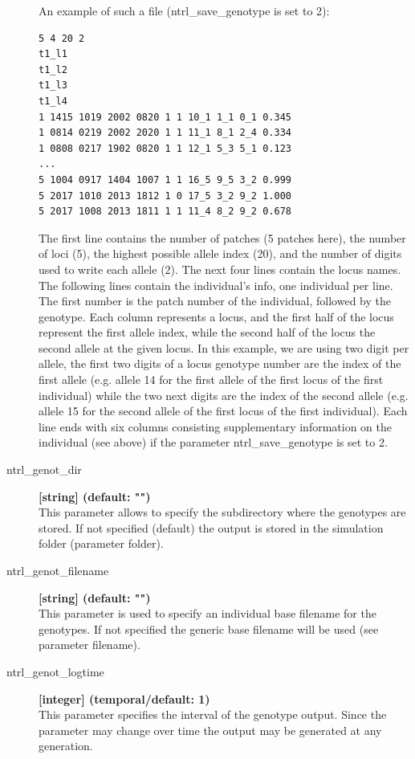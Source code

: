 \documentclass[letterpaper,12pt,oneside]{book}
\begin{document}
\begin{description}
An example of such a file (\textsf{ntrl\_save\_genotype} is set to 2):
\begin{lstlisting}[frame=single]
5 4 20 2
t1_l1
t1_l2
t1_l3
t1_l4
1 1415 1019 2002 0820 1 1 10_1 1_1 0_1 0.345
1 0814 0219 2002 2020 1 1 11_1 8_1 2_4 0.334
1 0808 0217 1902 0820 1 1 12_1 5_3 5_1 0.123
...
5 1004 0917 1404 1007 1 1 16_5 9_5 3_2 0.999
5 2017 1010 2013 1812 1 0 17_5 3_2 9_2 1.000
5 2017 1008 2013 1811 1 1 11_4 8_2 9_2 0.678
\end{lstlisting}

The first line contains the number of patches (5 patches here), the number of loci (5), the highest possible allele index (20), and the number of digits used to write each allele (2). The next four lines contain the locus names. The following lines contain the individual's info, one individual per line. The first number is the patch number of the individual, followed by the genotype. Each column represents a locus, and the first half of the locus represent the first allele index, while the second half of the locus the second allele at the given locus.  In this example, we are using two digit per allele, the first two digits of a locus genotype number are the index of the first allele (e.g. allele 14 for the first allele of the first locus of the first individual) while the two next digits are the index of the second allele (e.g. allele 15 for the second allele of the first locus of the first individual).  Each line ends with six columns consisting supplementary information on the individual (see above) if the parameter \textsf{ntrl\_save\_genotype} is set to 2.

\item[ntrl\_genot\_dir\index{ntrl\_genot\_dir}] \textbf{[string] (default: "")}\\
This parameter allows to specify the subdirectory where the genotypes are stored. If not specified (default) the output is stored in the simulation folder (parameter \textsf{folder}).

\item[ntrl\_genot\_filename\index{ntrl\_genot\_filename}] \textbf{[string] (default: "")}\\
This parameter is used to specify an individual base filename for the genotypes. If not specified the generic base filename will be used (see parameter \textsf{filename}).

\item[ntrl\_genot\_logtime\index{ntrl\_genot\_logtime}] \textbf{[integer] (temporal/default: 1)}\\
This parameter specifies the interval of the genotype output. Since the parameter may change over time the output may be generated at any generation.


\end{description}
\end{document}
